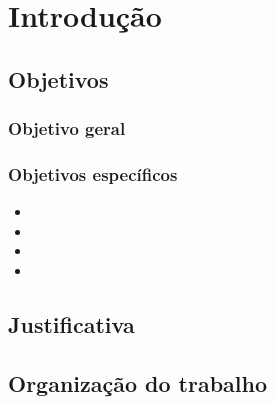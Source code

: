 
\chapter{Introdução}
\label{chap:introducao}




\section{Objetivos}
\label{sec:objetivos}

\subsection{Objetivo geral}


\subsection{Objetivos específicos}


\begin{itemize}
    \item 
    \item 
    \item 
    \item 
\end{itemize}

\section{Justificativa}
\label{sec:justificativa}


\section{Organização do trabalho}
\label{sec:organizacao}

